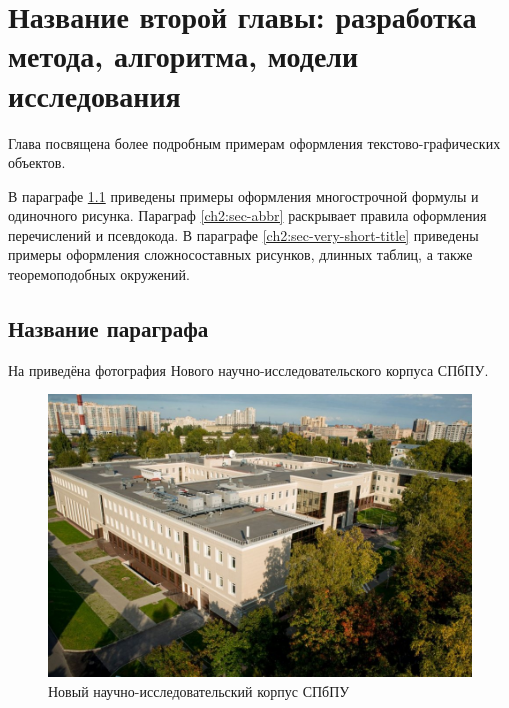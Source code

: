 \chapter{Название второй главы: разработка метода, алгоритма, модели исследования} \label{ch2}
	

Глава посвящена более подробным примерам оформления текстово-графических объектов.

В параграфе \ref{ch2:title-abbr} приведены примеры оформления многострочной формулы и одиночного рисунка. Параграф \ref{ch2:sec-abbr} раскрывает правила оформления перечислений и псевдокода. В параграфе \ref{ch2:sec-very-short-title} приведены примеры оформления сложносоставных рисунков, длинных таблиц, а также теоремоподобных окружений.


\section{Название параграфа} \label{ch2:title-abbr} %





На  приведёна фотография Нового научно-исследовательского корпуса СПбПУ.

	\begin{figure}[ht] 
	\center
	\includegraphics [scale=0.27] {my_folder/images/spbpu_new_bld_autumn}
	\caption{Новый научно-исследовательский корпус СПбПУ \cite{spbpu-gallery}} 
	\label{fig:spbpu-new-bld-autumn-ch2}  
	\end{figure}
	


